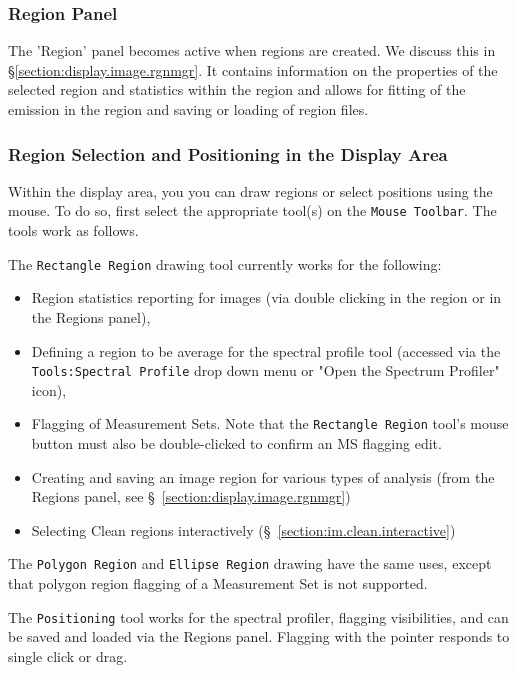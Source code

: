 \subsubsection{Region Panel}

The 'Region' panel becomes active when regions
are created. We discuss this in \S\ref{section:display.image.rgnmgr}. It contains
information on the properties of the selected region and statistics within the region and
allows for fitting of the emission in the region and saving or loading of region files.

\subsubsection{Region Selection and Positioning in the Display Area}
\label{section:display.viewerGUI.displaypanel.region}

Within the display area, you you can draw regions or select positions using the mouse.
To do so, first select the appropriate tool(s) on the {\tt Mouse Toolbar}. The tools
work as follows.

The {\tt Rectangle Region} drawing tool currently works for the following: 
\begin{itemize}
  \item Region statistics reporting for images (via double clicking in the region or in the Regions panel),
  \item Defining a region to be average for the spectral profile tool (accessed via the {\tt Tools:Spectral Profile} drop down menu or "Open the Spectrum Profiler" icon),
  \item Flagging of Measurement Sets. Note that the {\tt Rectangle Region} tool's mouse button must also be double-clicked to confirm an MS flagging edit.
  \item Creating and saving an image region for various types of analysis (from the Regions panel, see \S~\ref{section:display.image.rgnmgr})
  \item Selecting Clean regions interactively (\S~\ref{section:im.clean.interactive})
\end{itemize}

The {\tt Polygon Region} and {\tt Ellipse Region} drawing have the same uses, except that polygon region
flagging of a Measurement Set is not supported.

The {\tt Positioning} tool works for the spectral profiler, flagging visibilities, and can be saved and loaded via the Regions panel. 
Flagging with the pointer responds to single click or drag.

